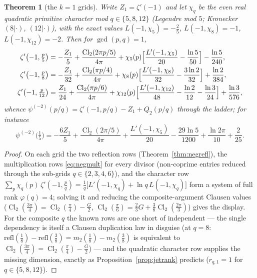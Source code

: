 \documentclass[11pt]{article}
\newtheorem{theorem}{Theorem}[section]
\theoremstyle{remark}
\begin{document}
\begin{theorem}[the $k=1$ grids]\label{thm:negq5812}
Write $Z_1=\zeta'(-1)$ and let $\chi_q$ be the even real quadratic
primitive character mod $q\in\{5,8,12\}$ (Legendre mod $5$; Kronecker
$(8|\cdot)$, $(12|\cdot)$), with the exact values
$L(-1,\chi_5)=-\tfrac25$, $L(-1,\chi_8)=-1$, $L(-1,\chi_{12})=-2$. Then
for $\gcd(p,q)=1$,
\begin{align*}
\zeta'\bigl(-1,\tfrac p5\bigr)
&=-\frac{Z_1}{5}+\frac{\operatorname{Cl}_2(2\pi p/5)}{4\pi}
+\chi_5(p)\Bigl[\frac{L'(-1,\chi_5)}{20}-\frac{\ln5}{50}\Bigr]
-\frac{\ln5}{240},\\
\zeta'\bigl(-1,\tfrac p8\bigr)
&=-\frac{Z_1}{32}+\frac{\operatorname{Cl}_2(\pi p/4)}{4\pi}
+\chi_8(p)\Bigl[\frac{L'(-1,\chi_8)}{32}-\frac{3\ln2}{32}\Bigr]
+\frac{\ln2}{384},\\
\zeta'\bigl(-1,\tfrac p{12}\bigr)
&=\frac{Z_1}{24}+\frac{\operatorname{Cl}_2(\pi p/6)}{4\pi}
+\chi_{12}(p)\Bigl[\frac{L'(-1,\chi_{12})}{48}-\frac{\ln2}{12}
-\frac{\ln3}{24}\Bigr]
+\frac{\ln3}{576},
\end{align*}
whence $\psi^{(-2)}(p/q)=\zeta'(-1,p/q)-Z_1+Q_2(p/q)$ through the ladder;
for instance
\[
\psi^{(-2)}\bigl(\tfrac15\bigr)
=-\frac{6Z_1}{5}+\frac{\operatorname{Cl}_2(2\pi/5)}{4\pi}
+\frac{L'(-1,\chi_5)}{20}-\frac{29\ln5}{1200}+\frac{\ln2\pi}{10}
+\frac2{25}.
\]
\end{theorem}

\begin{proof}
On each grid the two reflection rows
(Theorem~\ref{thm:negrefl}), the multiplication rows
\eqref{eq:negmult} for every divisor (non-coprime entries
reduced through the sub-grids $q\in\{2,3,4,6\}$), and the character row
$\sum_p\chi_q(p)\,\zeta'(-1,\tfrac pq)
=\tfrac1q\bigl[L'(-1,\chi_q)+\ln q\,L(-1,\chi_q)\bigr]$ form a system of
full rank $\varphi(q)=4$; solving it and reducing the composite-argument
Clausen values
($\operatorname{Cl}_2(\tfrac{3\pi}4)=\operatorname{Cl}_2(\tfrac\pi4)-\tfrac G2$,
$\operatorname{Cl}_2(\tfrac\pi6)=\tfrac23G+\tfrac38\operatorname{Cl}_2(\tfrac{2\pi}3)$)
gives the display. For the composite $q$ the known rows are one short of
independent — the single dependency is itself a Clausen duplication law in
disguise (at $q=8$: $\mathrm{refl}(\tfrac18)-\mathrm{refl}(\tfrac38)
=m_2(\tfrac18)-m_2(\tfrac38)$ is equivalent to
$\operatorname{Cl}_2(\tfrac{3\pi}4)=\operatorname{Cl}_2(\tfrac\pi4)-\tfrac G2$)
— and the quadratic character row supplies the missing dimension, exactly
as Proposition~\ref{prop:jetrank} predicts ($r_{q,1}=1$ for
$q\in\{5,8,12\}$).
\end{proof}
\end{document}
